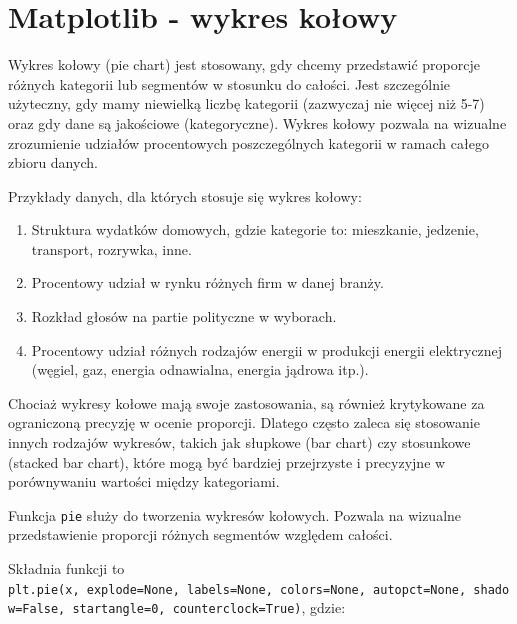 \documentclass[
  polish,
  letterpaper,
  DIV=11,
  numbers=noendperiod]{scrreprt}
\providecommand{\tightlist}{%
  \setlength{\itemsep}{0pt}\setlength{\parskip}{0pt}}
\begin{document}
\chapter{Matplotlib - wykres
kołowy}\label{matplotlib---wykres-koux142owy}

Wykres kołowy (pie chart) jest stosowany, gdy chcemy przedstawić
proporcje różnych kategorii lub segmentów w stosunku do całości. Jest
szczególnie użyteczny, gdy mamy niewielką liczbę kategorii (zazwyczaj
nie więcej niż 5-7) oraz gdy dane są jakościowe (kategoryczne). Wykres
kołowy pozwala na wizualne zrozumienie udziałów procentowych
poszczególnych kategorii w ramach całego zbioru danych.

Przykłady danych, dla których stosuje się wykres kołowy:

\begin{enumerate}
\def\labelenumi{\arabic{enumi}.}
\tightlist
\item
  Struktura wydatków domowych, gdzie kategorie to: mieszkanie, jedzenie,
  transport, rozrywka, inne.
\item
  Procentowy udział w rynku różnych firm w danej branży.
\item
  Rozkład głosów na partie polityczne w wyborach.
\item
  Procentowy udział różnych rodzajów energii w produkcji energii
  elektrycznej (węgiel, gaz, energia odnawialna, energia jądrowa itp.).
\end{enumerate}

Chociaż wykresy kołowe mają swoje zastosowania, są również krytykowane
za ograniczoną precyzję w ocenie proporcji. Dlatego często zaleca się
stosowanie innych rodzajów wykresów, takich jak słupkowe (bar chart) czy
stosunkowe (stacked bar chart), które mogą być bardziej przejrzyste i
precyzyjne w porównywaniu wartości między kategoriami.

Funkcja \texttt{pie} służy do tworzenia wykresów kołowych. Pozwala na
wizualne przedstawienie proporcji różnych segmentów względem całości.

Składnia funkcji to
\texttt{plt.pie(x,\ explode=None,\ labels=None,\ colors=None,\ autopct=None,\ shadow=False,\ startangle=0,\ counterclock=True)},
gdzie:
\end{document}
